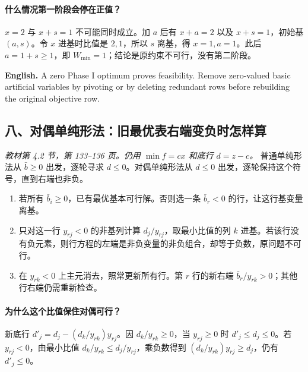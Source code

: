 \documentclass[UTF8,11pt,a4paper]{ctexart}
\newcommand{\EN}[1]{\par\noindent \textbf{English.} #1\par}
\begin{document}
\paragraph{什么情况第一阶段会停在正值？}
$x=2$ 与 $x+s=1$ 不可能同时成立。加 $a$ 后有 $x+a=2$ 以及 $x+s=1$，初始基 $(a,s)$。令 $x$ 进基时比值是 $2,1$，所以 $s$ 离基，得 $x=1,a=1$。此后 $a=1+s\ge1$，即 $W_{\min}=1$；结论是原约束不可行，没有第二阶段。
\EN{A zero Phase I optimum proves feasibility. Remove zero-valued basic artificial variables by pivoting or by deleting redundant rows before rebuilding the original objective row.}

\clearpage
\subsection*{八、对偶单纯形法：旧最优表右端变负时怎样算}
\noindent\textit{教材第 4.2 节，第 133--136 页。仍用 $\min f=cx$ 和底行 $d=z-c$。}
普通单纯形法从 $\bar b\ge0$ 出发，逐轮寻求 $d\le0$。对偶单纯形法从 $d\le0$ 出发，逐轮保持这个符号，直到右端也非负。
\begin{enumerate}
\item 若所有 $\bar b_i\ge0$，已有最优基本可行解。否则选一条 $\bar b_r<0$ 的行，让这行基变量离基。
\item 只对这一行 $y_{rj}<0$ 的非基列计算 $d_j/y_{rj}$，取最小比值的列 $k$ 进基。若该行没有负元素，则行方程的左端是非负变量的非负组合，却等于负数，原问题不可行。
\item 在 $y_{rk}<0$ 上主元消去，照常更新所有行。第 $r$ 行的新右端 $\bar b_r/y_{rk}>0$；其他行右端仍需重新检查。
\end{enumerate}
\paragraph{为什么这个比值保住对偶可行？}
新底行 $d'_j=d_j-(d_k/y_{rk})y_{rj}$。因 $d_k/y_{rk}\ge0$，当 $y_{rj}\ge0$ 时 $d'_j\le d_j\le0$。若 $y_{rj}<0$，由最小比值 $d_k/y_{rk}\le d_j/y_{rj}$，乘负数得到 $(d_k/y_{rk})y_{rj}\ge d_j$，仍有 $d'_j\le0$。
\end{document}
